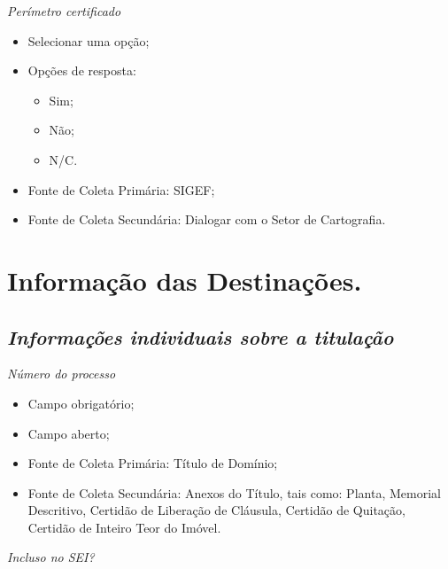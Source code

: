 \documentclass[
  letterpaper,
]{report}
\providecommand{\tightlist}{%
  \setlength{\itemsep}{0pt}\setlength{\parskip}{0pt}}\usepackage{longtable,booktabs,array}
\begin{document}
\emph{Perímetro certificado}

\begin{itemize}
\tightlist
\item
  Selecionar uma opção;
\item
  Opções de resposta:

  \begin{itemize}
  \tightlist
  \item
    Sim;
  \item
    Não;
  \item
    N/C.
  \end{itemize}
\item
  Fonte de Coleta Primária: SIGEF;
\item
  Fonte de Coleta Secundária: Dialogar com o Setor de Cartografia.
\end{itemize}

\hypertarget{informauxe7uxe3o-das-destinauxe7uxf5es.}{%
\section{Informação das
Destinações.}\label{informauxe7uxe3o-das-destinauxe7uxf5es.}}

\hypertarget{informauxe7uxf5es-individuais-sobre-a-titulauxe7uxe3o}{%
\subsection{\texorpdfstring{\emph{Informações individuais sobre a
titulação}}{Informações individuais sobre a titulação}}\label{informauxe7uxf5es-individuais-sobre-a-titulauxe7uxe3o}}

\emph{Número do processo}

\begin{itemize}
\tightlist
\item
  Campo obrigatório;
\item
  Campo aberto;
\item
  Fonte de Coleta Primária: Título de Domínio;
\item
  Fonte de Coleta Secundária: Anexos do Título, tais como: Planta,
  Memorial Descritivo, Certidão de Liberação de Cláusula, Certidão de
  Quitação, Certidão de Inteiro Teor do Imóvel.
\end{itemize}

\emph{Incluso no SEI?}
\end{document}

